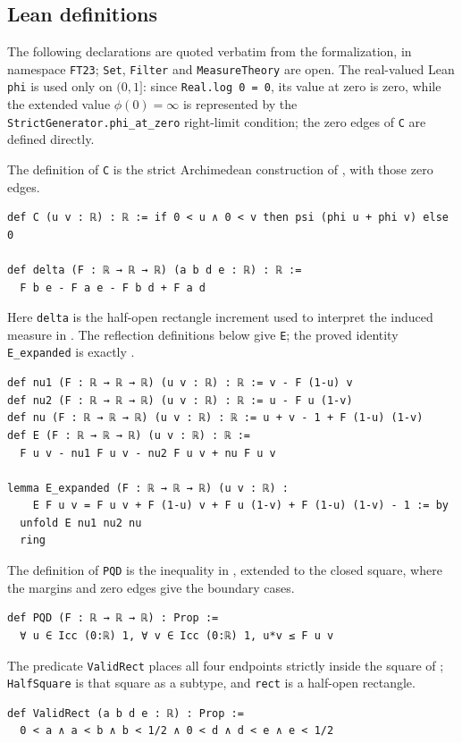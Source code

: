 \documentclass[11pt]{article}
\begin{document}
\begin{appendices}
\section{Lean definitions}\label{app:definitions}
The following declarations are quoted verbatim from the formalization,
in namespace \texttt{FT23}; \texttt{Set}, \texttt{Filter} and
\texttt{MeasureTheory} are open. The real-valued Lean \texttt{phi} is used
only on $(0,1]$: since \texttt{Real.log 0 = 0}, its value at zero is zero,
while the extended value $\phi(0)=\infty$ is represented by the
\texttt{StrictGenerator.phi\_at\_zero} right-limit condition; the zero
edges of \texttt{C} are defined directly.

The definition of \texttt{C} is the strict Archimedean construction of
\cite[Section 2]{ft}, with those zero edges.
\begingroup
\footnotesize
\begin{verbatim}
def C (u v : ℝ) : ℝ := if 0 < u ∧ 0 < v then psi (phi u + phi v) else 0

def delta (F : ℝ → ℝ → ℝ) (a b d e : ℝ) : ℝ :=
  F b e - F a e - F b d + F a d
\end{verbatim}
\endgroup
Here \texttt{delta} is the half-open rectangle increment used to
interpret the induced measure in \cite[Definition 1]{ft}.
The reflection definitions below give \texttt{E}; the proved identity
\texttt{E\_expanded} is exactly \cite[equation (2.2)]{ft}.
\begingroup
\footnotesize
\begin{verbatim}
def nu1 (F : ℝ → ℝ → ℝ) (u v : ℝ) : ℝ := v - F (1-u) v
def nu2 (F : ℝ → ℝ → ℝ) (u v : ℝ) : ℝ := u - F u (1-v)
def nu (F : ℝ → ℝ → ℝ) (u v : ℝ) : ℝ := u + v - 1 + F (1-u) (1-v)
def E (F : ℝ → ℝ → ℝ) (u v : ℝ) : ℝ :=
  F u v - nu1 F u v - nu2 F u v + nu F u v

lemma E_expanded (F : ℝ → ℝ → ℝ) (u v : ℝ) :
    E F u v = F u v + F (1-u) v + F u (1-v) + F (1-u) (1-v) - 1 := by
  unfold E nu1 nu2 nu
  ring
\end{verbatim}
\endgroup
The definition of \texttt{PQD} is the inequality in
\cite[Section 2]{ft}, extended to the closed square, where the margins
and zero edges give the boundary cases.
\begingroup
\footnotesize
\begin{verbatim}
def PQD (F : ℝ → ℝ → ℝ) : Prop :=
  ∀ u ∈ Icc (0:ℝ) 1, ∀ v ∈ Icc (0:ℝ) 1, u*v ≤ F u v
\end{verbatim}
\endgroup
The predicate \texttt{ValidRect} places all four endpoints strictly
inside the square of \cite[Definition 1]{ft}; \texttt{HalfSquare} is that
square as a subtype, and \texttt{rect} is a half-open rectangle.
\begingroup
\footnotesize
\begin{verbatim}
def ValidRect (a b d e : ℝ) : Prop :=
  0 < a ∧ a < b ∧ b < 1/2 ∧ 0 < d ∧ d < e ∧ e < 1/2


\end{verbatim}
\end{appendices}
\end{document}
